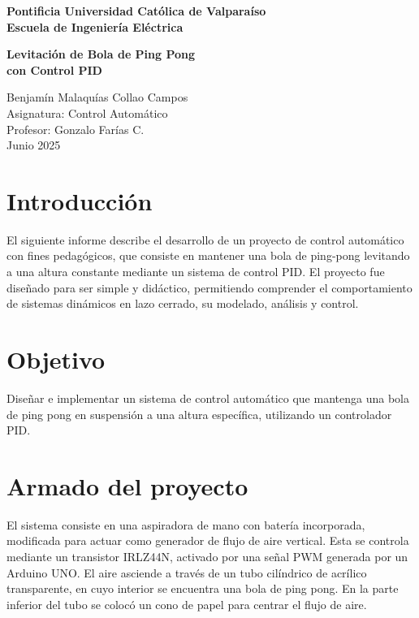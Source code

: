 \documentclass[12pt]{article}
\begin{document}
\begin{titlepage}
    \centering
    \vspace*{2cm}
    
    {\Large\bfseries Pontificia Universidad Católica de Valparaíso\\[0.2cm]
    Escuela de Ingeniería Eléctrica\\[2cm]}
    
    {\Huge\bfseries Levitación de Bola de Ping Pong\\[0.3cm]
    con Control PID\\[2cm]}
    
    \vfill

    {\large
    Benjamín Malaquías Collao Campos\\[0.2cm]
    Asignatura: Control Automático\\[0.2cm]
    Profesor: Gonzalo Farías C.\\[1.5cm]
    Junio 2025
    }

\end{titlepage}


\newpage


\section*{Introducción}

El siguiente informe describe el desarrollo de un proyecto de control automático con fines pedagógicos, que consiste en mantener una bola de ping-pong levitando a una altura constante mediante un sistema de control PID. El proyecto fue diseñado para ser simple y didáctico, permitiendo comprender el comportamiento de sistemas dinámicos en lazo cerrado, su modelado, análisis y control.

\section{Objetivo}

Diseñar e implementar un sistema de control automático que mantenga una bola de ping pong en suspensión a una altura específica, utilizando un controlador PID.

\section{Armado del proyecto}

El sistema consiste en una aspiradora de mano con batería incorporada, modificada para actuar como generador de flujo de aire vertical. Esta se controla mediante un transistor IRLZ44N, activado por una señal PWM generada por un Arduino UNO. El aire asciende a través de un tubo cilíndrico de acrílico transparente, en cuyo interior se encuentra una bola de ping pong. En la parte inferior del tubo se colocó un cono de papel para centrar el flujo de aire.
\end{document}
